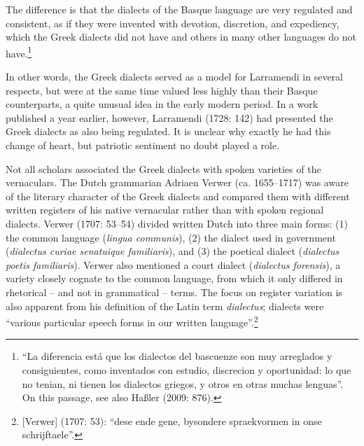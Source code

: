 \documentclass[12pt]{article}
\newenvironment{styleStandard}{\renewcommand\baselinestretch{1.25}\setlength\leftskip{0in}\setlength\rightskip{0in}\setlength\parindent{0.1972in}\setlength\parfillskip{0pt plus 1fil}\setlength\parskip{0in plus 1pt}\writerlistparindent\writerlistleftskip\leavevmode\normalfont\normalsize\writerlistlabel\ignorespaces}{\unskip\vspace{0in plus 1pt}\par}
\newenvironment{styleQuote}{\renewcommand\baselinestretch{1.25}\setlength\leftskip{0.3937in}\setlength\rightskip{0in}\setlength\parindent{0in}\setlength\parfillskip{0pt plus 1fil}\setlength\parskip{0.1665in plus 0.016649999in}\writerlistparindent\writerlistleftskip\leavevmode\normalfont\normalsize\writerlistlabel\ignorespaces}{\unskip\vspace{0.1665in plus 0.016649999in}\par}
\newcommand\writerlistleftskip{}
\newcommand\writerlistparindent{}
\newcommand\writerlistlabel{}
\begin{document}
\begin{styleQuote}
The difference is that the dialects of the Basque language are very regulated and consistent, as if they were invented with devotion, discretion, and expediency, which the Greek dialects did not have and others in many other languages do not have.\footnote{ “La diferencia está que los dialectos del bascuenze son muy arreglados y consiguientes, como inventados con estudio, discrecion y oportunidad: lo que no tenian, ni tienen los dialectos griegos, y otros en otras muchas lenguas”. On this passage, see also Haßler (2009: 876).}
\end{styleQuote}

\begin{styleStandard}
In other words, the Greek dialects served as a model for Larramendi in several respects, but were at the same time valued less highly than their Basque counterparts, a quite unusual idea in the early modern period. In a work published a year earlier, however, Larramendi (1728: 142) had presented the Greek dialects as also being regulated. It is unclear why exactly he had this change of heart, but patriotic sentiment no doubt played a role.
\end{styleStandard}

\begin{styleStandard}
Not all scholars associated the Greek dialects with spoken varieties of the vernaculars. The Dutch grammarian Adriaen Verwer (ca. 1655–1717) was aware of the literary character of the Greek dialects and compared them with different written registers of his native vernacular rather than with spoken regional dialects. Verwer (1707: 53–54) divided written Dutch into three main forms: (1) the common language (\textit{lingua communis}), (2) the dialect used in government (\textit{dialectus curiae senatuique familiaris}), and (3) the poetical dialect (\textit{dialectus poetis familiaris}). Verwer also mentioned a court dialect (\textit{dialectus forensis}), a variety closely cognate to the common language, from which it only differed in rhetorical – and not in grammatical – terms. The focus on register variation is also apparent from his definition of the Latin term \textit{dialectus}; dialects were “various particular speech forms in our written language”.\footnote{ [Verwer] (1707: 53): “dese ende gene, bysondere spraekvormen in onse schrijftaele”.}
\end{styleStandard}
\end{document}
